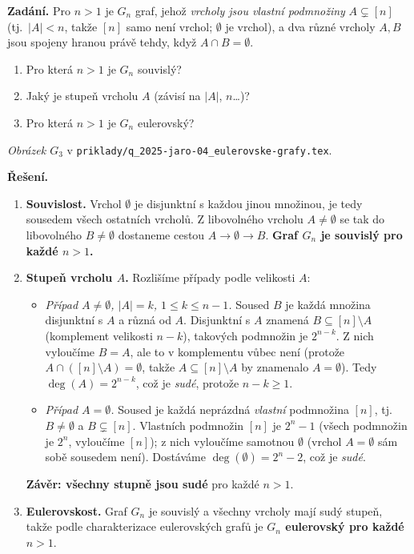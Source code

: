 \documentclass[11pt,a4paper]{article}
\begin{document}
\begin{priklad} \par
\textbf{Zadání.}
Pro $n>1$ je $G_n$ graf, jehož \emph{vrcholy jsou vlastní podmnožiny} $A\subsetneq[n]$ (tj.\ $|A|<n$, takže $[n]$ samo není vrchol; $\emptyset$ je vrchol), a dva různé vrcholy $A,B$ jsou spojeny hranou právě tehdy, když $A\cap B=\emptyset$.
\begin{enumerate}[label=(\arabic*)]
  \item Pro která $n>1$ je $G_n$ souvislý?
  \item Jaký je stupeň vrcholu $A$ (závisí na $|A|$, $n$\dots)?
  \item Pro která $n>1$ je $G_n$ eulerovský?
\end{enumerate}
\emph{Obrázek $G_3$} v \texttt{priklady/q\_2025-jaro-04\_eulerovske-grafy.tex}.

\textbf{Řešení.}
\begin{enumerate}[label=(\arabic*)]
  \item \textbf{Souvislost.} Vrchol $\emptyset$ je disjunktní s každou jinou množinou, je tedy sousedem všech ostatních vrcholů. Z libovolného vrcholu $A\ne\emptyset$ se tak do libovolného $B\ne\emptyset$ dostaneme cestou $A\to\emptyset\to B$. \textbf{Graf $G_n$ je souvislý pro každé $n>1$.}
  \item \textbf{Stupeň vrcholu $A$.} Rozlišíme případy podle velikosti $A$:
    \begin{itemize}
      \item \emph{Případ $A\ne\emptyset$, $|A|=k$, $1\le k\le n-1$.} Soused $B$ je každá množina disjunktní s $A$ a různá od $A$. Disjunktní s $A$ znamená $B\subseteq[n]\setminus A$ (komplement velikosti $n-k$), takových podmnožin je $2^{n-k}$. Z nich vyloučíme $B=A$, ale to v komplementu vůbec není (protože $A\cap([n]\setminus A)=\emptyset$, takže $A\subseteq[n]\setminus A$ by znamenalo $A=\emptyset$). Tedy $\boxed{\deg(A)=2^{n-k}}$, což je \emph{sudé}, protože $n-k\ge 1$.
      \item \emph{Případ $A=\emptyset$.} Soused je každá neprázdná \emph{vlastní} podmnožina $[n]$, tj.\ $B\ne\emptyset$ a $B\subsetneq[n]$. Vlastních podmnožin $[n]$ je $2^n-1$ (všech podmnožin je $2^n$, vyloučíme $[n]$); z nich vyloučíme samotnou $\emptyset$ (vrchol $A=\emptyset$ sám sobě sousedem není). Dostáváme $\boxed{\deg(\emptyset)=2^n-2}$, což je \emph{sudé}.
    \end{itemize}
    \textbf{Závěr: všechny stupně jsou sudé} pro každé $n>1$.
  \item \textbf{Eulerovskost.} Graf $G_n$ je souvislý a všechny vrcholy mají sudý stupeň, takže podle charakterizace eulerovských grafů je \textbf{$G_n$ eulerovský pro každé $n>1$}.
\end{enumerate}
\end{priklad}
\end{document}
